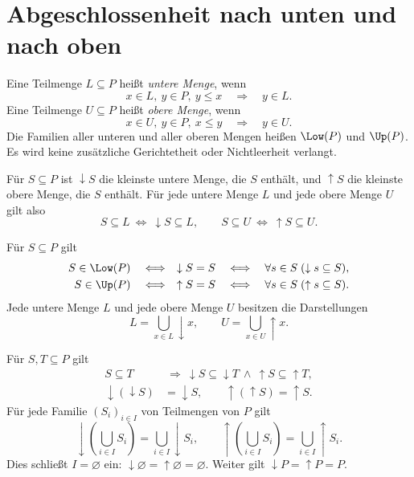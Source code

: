 \section{Abgeschlossenheit nach unten und nach oben}

\begin{definition}
\label{b12guide:def:lower-upper}
Eine Teilmenge $L\subseteq P$ heißt \emph{untere Menge}, wenn
\[
 x\in L,\ y\in P,\ y\leq x\quad\Longrightarrow\quad y\in L.
\]
Eine Teilmenge $U\subseteq P$ heißt \emph{obere Menge}, wenn
\[
 x\in U,\ y\in P,\ x\leq y\quad\Longrightarrow\quad y\in U.
\]
Die Familien aller unteren und aller oberen Mengen heißen
$\Low(P)$ und $\Up(P)$. Es wird keine zusätzliche
Gerichtetheit oder Nichtleerheit verlangt.
\end{definition}

\begin{theorem}
\label{b12guide:thm:least-closure}
Für $S\subseteq P$ ist $\downarrow S$ die kleinste untere Menge,
die $S$ enthält, und $\uparrow S$ die kleinste obere Menge,
die $S$ enthält. Für jede untere Menge $L$ und jede obere Menge $U$ gilt also
\[
 S\subseteq L\ \Longleftrightarrow\ \downarrow S\subseteq L,
 \qquad
 S\subseteq U\ \Longleftrightarrow\ \uparrow S\subseteq U.
\]
\end{theorem}

\begin{theorem}
\label{b12guide:thm:closed-criteria}
Für $S\subseteq P$ gilt
\[
\begin{aligned}
 S\in\Low(P)
 &\quad\Longleftrightarrow\quad\downarrow S=S
 \quad\Longleftrightarrow\quad
       \forall s\in S\;(\downarrow s\subseteq S),\\
 S\in\Up(P)
 &\quad\Longleftrightarrow\quad\uparrow S=S
 \quad\Longleftrightarrow\quad
       \forall s\in S\;(\uparrow s\subseteq S).
\end{aligned}
\]
Jede untere Menge $L$ und jede obere Menge $U$ besitzen die
Darstellungen
\[
 L=\bigcup_{x\in L}\downarrow x,\qquad
 U=\bigcup_{x\in U}\uparrow x.
\]
\end{theorem}

\begin{theorem}[Hüllengesetze]\label{b12guide:thm:closure-laws}
Für $S,T\subseteq P$ gilt
\[
\begin{aligned}
 S\subseteq T&\ \Rightarrow\
 \downarrow S\subseteq\downarrow T\ \land\
 \uparrow S\subseteq\uparrow T,\\
 \downarrow(\downarrow S)&=\downarrow S,\qquad
 \uparrow(\uparrow S)=\uparrow S.
\end{aligned}
\]
Für jede Familie $(S_i)_{i\in I}$ von Teilmengen von $P$ gilt
\[
 \downarrow\!\left(\bigcup_{i\in I}S_i\right)
     =\bigcup_{i\in I}\downarrow S_i,\qquad
 \uparrow\!\left(\bigcup_{i\in I}S_i\right)
     =\bigcup_{i\in I}\uparrow S_i.
\]
Dies schließt $I=\varnothing$ ein:
$\downarrow\varnothing=\uparrow\varnothing=\varnothing$.
Weiter gilt $\downarrow P=\uparrow P=P$.
\end{theorem}

